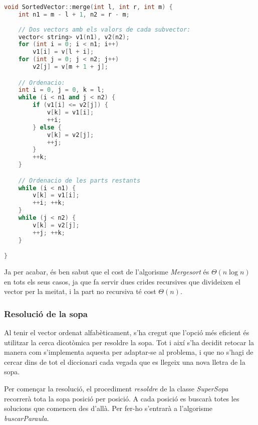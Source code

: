 \documentclass[titlepage]{article}
\begin{document}
\begin{lstlisting}[language=C++]
void SortedVector::merge(int l, int r, int m) {
    int n1 = m - l + 1, n2 = r - m;
    
    // Dos vectors amb els valors de cada subvector:
    vector< string> v1(n1), v2(n2);
    for (int i = 0; i < n1; i++)
        v1[i] = v[l + i];
    for (int j = 0; j < n2; j++)
        v2[j] = v[m + 1 + j];

    // Ordenacio:
    int i = 0, j = 0, k = l;
    while (i < n1 and j < n2) {
        if (v1[i] <= v2[j]) {
            v[k] = v1[i];
            ++i;
        } else {
            v[k] = v2[j];
            ++j;
        }
        ++k;
    }

    // Ordenacio de les parts restants
    while (i < n1) {
        v[k] = v1[i];
        ++i; ++k;
    }
    while (j < n2) {
        v[k] = v2[j];
        ++j; ++k;
    }

}
\end{lstlisting}

Ja per acabar, és ben sabut que el cost de l'algorisme \textit{Mergesort} és $\Theta(n\log{}n)$ en tots els seus casos, ja que fa servir dues crides recursives que divideixen el vector per la meitat, i la part no recursiva té cost $\Theta(n)$.


\subsubsection{Resolució de la sopa}
Al tenir el vector ordenat alfabèticament, s'ha cregut que l'opció més eficient és utilitzar la cerca dicotòmica per resoldre la sopa. Tot i així s'ha decidit retocar la manera com s'implementa aquesta per adaptar-se al problema, i que no s'hagi de cercar dins de tot el diccionari cada vegada que es llegeix una nova lletra de la sopa.\par
Per començar la resolució, el procediment \textit{resoldre} de la classe \textit{SuperSopa} recorrerà tota la sopa posició per posició. A cada posició es buscarà totes les solucions que comencen des d'allà. Per fer-ho s'entrarà a l'algorisme \textit{buscarParaula}.
\end{document}

